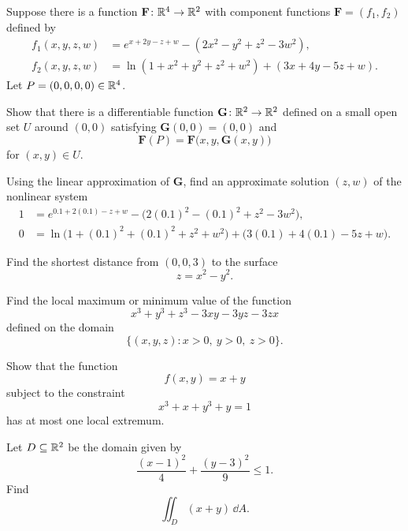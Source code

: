 \begin{problem}
Suppose there is a function $\mathbf F\colon\mathbb{R}^4\to\mathbb{R}^2$ with component functions $\mathbf F=(f_1,f_2)$ defined by
\[
\begin{aligned}
f_1(x,y,z,w)
&=e^{x+2y-z+w}-(2x^2-y^2+z^2-3w^2),\\
f_2(x,y,z,w)
&=\ln(1+x^2+y^2+z^2+w^2)+(3x+4y-5z+w).
\end{aligned}
\]
Let $P=(0,0,0,0)\in\mathbb{R}^4$.
\begin{problemsubparts}
\item Show that there is a differentiable function $\mathbf G\colon\mathbb{R}^2\to\mathbb{R}^2$ defined on a small open set $U$ around $(0,0)$ satisfying $\mathbf G(0,0)=(0,0)$ and
\[
\mathbf F(P)=\mathbf F\bigl(x,y,\mathbf G(x,y)\bigr)
\]
for $(x,y)\in U$.
\item Using the linear approximation of $\mathbf G$, find an approximate solution $(z,w)$ of the nonlinear system
\[
\begin{aligned}
1&=e^{0.1+2(0.1)-z+w}-\bigl(2(0.1)^2-(0.1)^2+z^2-3w^2\bigr),\\
0&=\ln\bigl(1+(0.1)^2+(0.1)^2+z^2+w^2\bigr)
   +\bigl(3(0.1)+4(0.1)-5z+w\bigr).
\end{aligned}
\]
\end{problemsubparts}
\end{problem}

\begin{problem}
Find the shortest distance from $(0,0,3)$ to the surface
\[
z=x^2-y^2.
\]
\end{problem}

\begin{problem}
Find the local maximum or minimum value of the function
\[
x^3+y^3+z^3-3xy-3yz-3zx
\]
defined on the domain
\[
\{(x,y,z):x>0,\ y>0,\ z>0\}.
\]
\end{problem}

\begin{problem}
Show that the function
\[
f(x,y)=x+y
\]
subject to the constraint
\[
x^3+x+y^3+y=1
\]
has at most one local extremum.
\end{problem}

\begin{problem}
Let $D\subseteq\mathbb{R}^2$ be the domain given by
\[
\frac{(x-1)^2}{4}+\frac{(y-3)^2}{9}\le1.
\]
Find
\[
\iint_D(x+y)\,\dd A.
\]
\end{problem}

